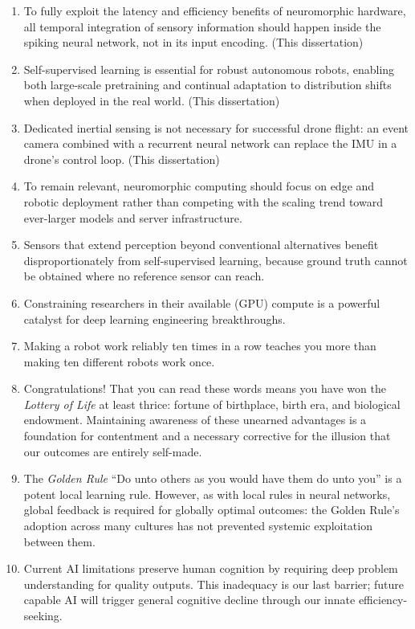 \documentclass{propositions}
\begin{document}
\begin{enumerate}
\itemsep0em 
    \item To fully exploit the latency and efficiency benefits of neuromorphic hardware, all temporal integration of sensory information should happen inside the spiking neural network, not in its input encoding. (This dissertation)
    \item Self-supervised learning is essential for robust autonomous robots, enabling both large-scale pretraining and continual adaptation to distribution shifts when deployed in the real world. (This dissertation)
    \item Dedicated inertial sensing is not necessary for successful drone flight: an event camera combined with a recurrent neural network can replace the IMU in a drone's control loop. (This dissertation)
    \item To remain relevant, neuromorphic computing should focus on edge and robotic deployment rather than competing with the scaling trend toward ever-larger models and server infrastructure.
    \item Sensors that extend perception beyond conventional alternatives benefit disproportionately from self-supervised learning, because ground truth cannot be obtained where no reference sensor can reach.
    \item Constraining researchers in their available (GPU) compute is a powerful catalyst for deep learning engineering breakthroughs.
    \item Making a robot work reliably ten times in a row teaches you more than making ten different robots work once.
    \item Congratulations! That you can read these words means you have won the \emph{Lottery of Life} at least thrice: fortune of birthplace, birth era, and biological endowment. Maintaining awareness of these unearned advantages is a foundation for contentment and a necessary corrective for the illusion that our outcomes are entirely self-made.
    \item The \emph{Golden Rule} ``Do unto others as you would have them do unto you'' is a potent local learning rule. However, as with local rules in neural networks, global feedback is required for globally optimal outcomes: the Golden Rule's adoption across many cultures has not prevented systemic exploitation between them.
    \item Current AI limitations preserve human cognition by requiring deep problem understanding for quality outputs. This inadequacy is our last barrier; future capable AI will trigger general cognitive decline through our innate efficiency-seeking.
\end{enumerate}
\end{document}
